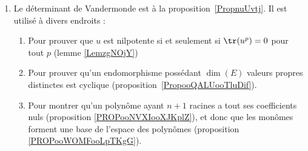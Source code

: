 \begin{enumerate}
\begin{enumerate}
\begin{enumerate}
			            \item
			                  En particulier le lemme~\ref{LEMooFRWKooVloCSM} nous dit comment un déterminant donne un vecteur orthogonal à une famille donnée de vecteurs.
		            \end{enumerate}
		      \item
		            Déterminant et aires, volumes
		            \begin{enumerate}
			            \item
			                  Déterminant et mesure de Lebesgue : théorème~\ref{ThoBVIJooMkifod}.
			            \item
			                  Aire du parallélogramme : il y a la formule avec le produit vectoriel dans la proposition~\ref{PropNormeProdVectoabsint}, mais l'aire proprement dite, avec une intégrale est dans la proposition \ref{PROPooAVVNooOOlSzr}.
			            \item
			                  Volume du parallélépipède avec le produit mixte et le déterminant \( 3\times 3\),~\ref{NORMooWWOKooWzScnZ}.
		            \end{enumerate}
	      \end{enumerate}
	      Tant que nous en sommes dans les interprétations géométriques, il faut lier déterminant, produit vectoriel, orthogonalité et mesure en notant que l'élément de volume lors de l'intégration en dimension \( 3\) est donné par \eqref{EQooNYWSooZuvcPe} : \( dS=\| T_u\times T_v \|\) qui est la norme du produit vectoriel des vecteurs tangents au paramétrage.

	      Nous voyons dans l'équation \eqref{EQooARMAooQPhQAL} que l'élément de volume pour une partie de dimension \( n\) dans \( \eR^m\) (à l'occasion d'y intégrer une fonction) est donné par un déterminant mettant en jeu les vecteurs tangents du paramétrage.
	\item
	      Le déterminant de Vandermonde est à la proposition~\ref{PropnuUvtj}. Il est utilisé à divers endroits :
	      \begin{enumerate}
		      \item
		            Pour prouver que \( u\) est nilpotente si et seulement si \( \tr(u^p)=0\) pour tout \( p\) (lemme \ref{LemzgNOjY})
		      \item
		            Pour prouver qu'un endomorphisme possédant \( \dim(E)\) valeurs propres distinctes est cyclique (proposition~\ref{PropooQALUooTluDif}).
		      \item
		            Pour montrer qu'un polynôme ayant \( n+1\) racines a tout ses coefficients nuls (proposition \ref{PROPooNVXIooXJKplZ}), et donc que les monômes forment une base de l'espace des polynômes (proposition \ref{PROPooWOMFooLpTKgG}).
	      \end{enumerate}

\end{enumerate}
